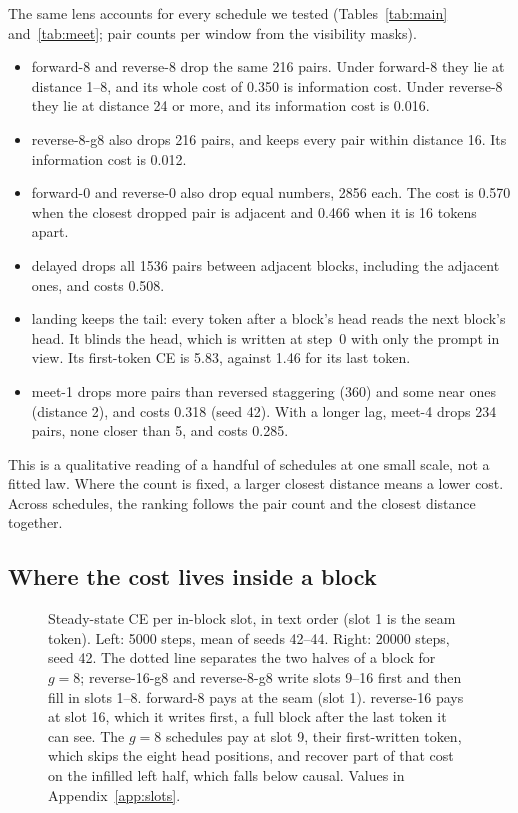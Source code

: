 \documentclass[11pt]{article}
\theoremstyle{definition}
\theoremstyle{remark}
\newcommand{\sch}[1]{\textsf{#1}}
\begin{document}
The same lens accounts for every schedule we tested (Tables~\ref{tab:main} and~\ref{tab:meet}; pair counts per window from the visibility masks).
\begin{itemize}
  \item \sch{forward-8} and \sch{reverse-8} drop the same 216 pairs. Under \sch{forward-8} they lie at distance 1--8, and its whole cost of 0.350 is information cost. Under \sch{reverse-8} they lie at distance 24 or more, and its information cost is 0.016.
  \item \sch{reverse-8-g8} also drops 216 pairs, and keeps every pair within distance 16. Its information cost is 0.012.
  \item \sch{forward-0} and \sch{reverse-0} also drop equal numbers, 2856 each. The cost is 0.570 when the closest dropped pair is adjacent and 0.466 when it is 16 tokens apart.
  \item \sch{delayed} drops all 1536 pairs between adjacent blocks, including the adjacent ones, and costs 0.508.
  \item \sch{landing} keeps the tail: every token after a block's head reads the next block's head. It blinds the head, which is written at step~0 with only the prompt in view. Its first-token CE is 5.83, against 1.46 for its last token.
  \item \sch{meet-1} drops more pairs than reversed staggering (360) and some near ones (distance 2), and costs 0.318 (seed 42). With a longer lag, \sch{meet-4} drops 234 pairs, none closer than 5, and costs 0.285.
\end{itemize}
This is a qualitative reading of a handful of schedules at one small scale, not a fitted law.
Where the count is fixed, a larger closest distance means a lower cost.
Across schedules, the ranking follows the pair count and the closest distance together.

\subsection{Where the cost lives inside a block}

\begin{figure}[t]
  \centering
  
  \caption{Steady-state CE per in-block slot, in text order (slot 1 is the seam token). Left: 5000 steps, mean of seeds 42--44. Right: 20000 steps, seed 42. The dotted line separates the two halves of a block for $g=8$; \sch{reverse-16-g8} and \sch{reverse-8-g8} write slots 9--16 first and then fill in slots 1--8. \sch{forward-8} pays at the seam (slot 1). \sch{reverse-16} pays at slot 16, which it writes first, a full block after the last token it can see. The $g=8$ schedules pay at slot 9, their first-written token, which skips the eight head positions, and recover part of that cost on the infilled left half, which falls below causal. Values in Appendix~\ref{app:slots}.}
  \label{fig:slots}
\end{figure}
\end{document}
